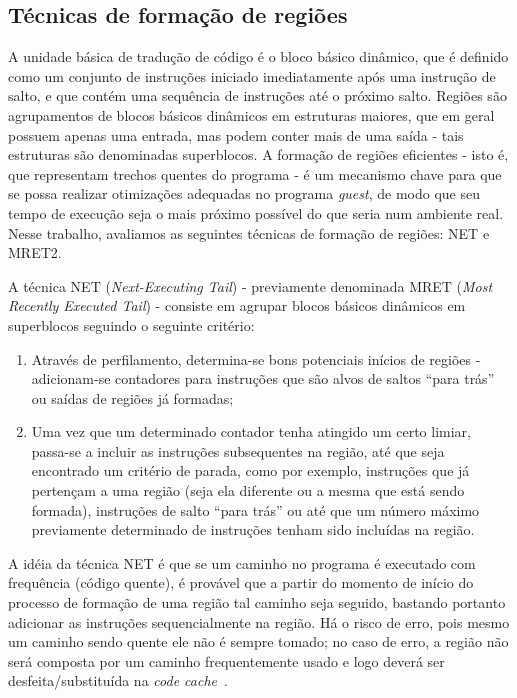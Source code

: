 \documentclass[11pt,twoside]{article}
\newcommand{\ccache}{\emph{code cache}}
\newcommand{\guest}{\emph{guest}}
\newcommand{\qq}[1]{``#1''}
\begin{document}
\subsection{Técnicas de formação de regiões}
\label{sec-formacao}
A unidade básica de tradução de código é o bloco básico dinâmico, que é definido como um conjunto de instruções iniciado imediatamente após uma instrução de salto, e que contém uma sequência de instruções até o próximo salto. Regiões são agrupamentos de blocos básicos dinâmicos em estruturas maiores, que em geral possuem apenas uma entrada, mas podem conter mais de uma saída - tais estruturas são denominadas superblocos. A formação de regiões eficientes - isto é, que representam trechos quentes do programa - é um mecanismo chave para que se possa realizar otimizações adequadas no programa \guest, de modo que seu tempo de execução seja o mais próximo possível do que seria num ambiente real. Nesse trabalho, avaliamos as seguintes técnicas de formação de regiões: NET e MRET2. 

A técnica NET (\emph{Next-Executing Tail}) \cite{net-region} - previamente denominada MRET (\emph{Most Recently Executed Tail}) - consiste em agrupar blocos básicos dinâmicos em superblocos seguindo o seguinte critério:
\begin{enumerate}
\item Através de perfilamento, determina-se bons potenciais inícios de regiões - adicionam-se contadores para instruções que são alvos de saltos \qq{para trás} ou saídas de regiões já formadas;


\item Uma vez que um determinado contador tenha atingido um certo limiar, passa-se a incluir as instruções subsequentes na região, até que seja encontrado um critério de parada, como por exemplo, instruções que já pertençam a uma região (seja ela diferente ou a mesma que está sendo formada), instruções de salto \qq{para trás} ou até que um número máximo previamente determinado  de instruções tenham sido incluídas na região.
\end{enumerate}
A idéia da técnica NET é que se um caminho no programa é executado com frequência (código quente), é provável que a partir do momento de início do processo de formação de uma região tal caminho seja seguido, bastando portanto adicionar as instruções sequencialmente na região. Há o risco de erro, pois mesmo um caminho sendo quente ele não é sempre tomado; no caso de erro, a região não será composta por um caminho frequentemente usado e logo deverá ser desfeita/substituída na \ccache~.
\end{document}
